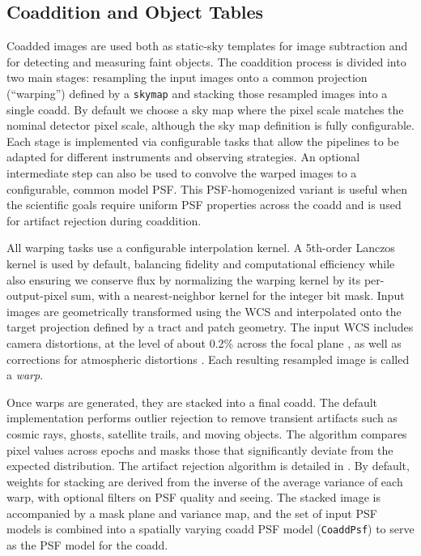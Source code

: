 \subsection{Coaddition and Object Tables}
\label{sec:coaddition-and-objects}

Coadded images are used both as static-sky templates for image subtraction and for detecting and measuring faint objects.
The coaddition process is divided into two main stages: resampling the input images onto a common projection (``warping'') defined by a \texttt{skymap}  and stacking those resampled images into a single coadd.
By default we choose a sky map where the pixel scale matches the nominal detector pixel scale, although the sky map definition is fully configurable.
Each stage is implemented via configurable tasks that allow the pipelines to be adapted for different instruments and observing strategies.
An optional intermediate step can also be used to convolve the warped images to a configurable, common model PSF.
This PSF-homogenized variant is useful when the scientific goals require uniform PSF properties across the coadd and is used for artifact rejection during coaddition.

All warping tasks use a configurable interpolation kernel.
A 5th-order Lanczos kernel is used by default, balancing fidelity and computational efficiency while also ensuring we conserve flux by normalizing the warping kernel by its per-output-pixel sum, with a nearest-neighbor kernel for the integer bit mask.
Input images are geometrically transformed using the WCS and interpolated onto the target projection defined by a tract and patch geometry.
The input WCS includes camera distortions, at the level of about 0.2\% across the focal plane \citep{LCA-11591}, as well as corrections for atmospheric distortions \citep{DMTN-324}.
Each resulting resampled image is called a \emph{warp}.

Once warps are generated, they are stacked into a final coadd.
The default implementation performs outlier rejection to remove transient artifacts such as cosmic rays, ghosts, satellite trails, and moving objects.
The algorithm compares pixel values across epochs and masks those that significantly deviate from the expected distribution.
The artifact rejection algorithm is detailed in \citet{DMTN-080}.
By default, weights for stacking are derived from the inverse of the average variance of each warp, with optional filters on PSF quality and seeing.
The stacked image is accompanied by a mask plane and variance map, and the set of input PSF models is combined into a spatially varying coadd PSF model (\texttt{CoaddPsf}) to serve as the PSF model for the coadd.


